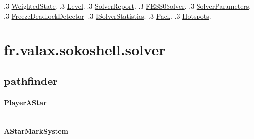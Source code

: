\documentclass[a4paper]{article}
\begin{document}
{        .3 \hyperref[package:fr.valax.sokoshell.solver.WeightedState.java]{WeightedState}\DTcomment{\pageref{package:fr.valax.sokoshell.solver.WeightedState.java}}.
        .3 \hyperref[package:fr.valax.sokoshell.solver.Level.java]{Level}\DTcomment{\pageref{package:fr.valax.sokoshell.solver.Level.java}}.
        .3 \hyperref[package:fr.valax.sokoshell.solver.SolverReport.java]{SolverReport}\DTcomment{\pageref{package:fr.valax.sokoshell.solver.SolverReport.java}}.
        .3 \hyperref[package:fr.valax.sokoshell.solver.FESS0Solver.java]{FESS0Solver}\DTcomment{\pageref{package:fr.valax.sokoshell.solver.FESS0Solver.java}}.
        .3 \hyperref[package:fr.valax.sokoshell.solver.SolverParameters.java]{SolverParameters}\DTcomment{\pageref{package:fr.valax.sokoshell.solver.SolverParameters.java}}.
        .3 \hyperref[package:fr.valax.sokoshell.solver.FreezeDeadlockDetector.java]{FreezeDeadlockDetector}\DTcomment{\pageref{package:fr.valax.sokoshell.solver.FreezeDeadlockDetector.java}}.
        .3 \hyperref[package:fr.valax.sokoshell.solver.ISolverStatistics.java]{ISolverStatistics}\DTcomment{\pageref{package:fr.valax.sokoshell.solver.ISolverStatistics.java}}.
        .3 \hyperref[package:fr.valax.sokoshell.solver.Pack.java]{Pack}\DTcomment{\pageref{package:fr.valax.sokoshell.solver.Pack.java}}.
        .3 \hyperref[package:fr.valax.sokoshell.solver.Hotspots.java]{Hotspots}\DTcomment{\pageref{package:fr.valax.sokoshell.solver.Hotspots.java}}.
}
    \section{fr.valax.sokoshell.solver}\label{package:fr.valax.sokoshell.solver}
        \subsection{pathfinder}\label{package:fr.valax.sokoshell.solver.pathfinder}
                \paragraph{PlayerAStar}\label{package:fr.valax.sokoshell.solver.pathfinder.PlayerAStar.java}
                \inputminted{java}{/home/poulpogaz/dev/Java/project/sokoshell/sokoshell/src/main/java/fr/valax/sokoshell/solver/pathfinder/PlayerAStar.java}
                \paragraph{AStarMarkSystem}\label{package:fr.valax.sokoshell.solver.pathfinder.AStarMarkSystem.java}
                \inputminted{java}{/home/poulpogaz/dev/Java/project/sokoshell/sokoshell/src/main/java/fr/valax/sokoshell/solver/pathfinder/AStarMarkSystem.java}
\end{document}
